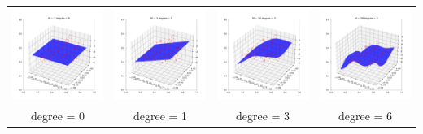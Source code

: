 \documentclass[11pt]{article}
\begin{document}

\begin{center}
  \setlength\tabcolsep{0pt}
  \begin{tabular}{cccc}
    \includegraphics[width=5cm]{regression/2d-degree=0-train-fig.png}
      & \includegraphics[width=5cm]{regression/2d-degree=1-train-fig.png}&
      \includegraphics[width=5cm]{regression/2d-degree=3-train-fig.png}
        & \includegraphics[width=5cm]{regression/2d-degree=6-train-fig.png}\\
      degree = 0 & degree = 1&
        degree = 3 & degree = 6\\
  \end{tabular}
\end{center}
\end{document}
